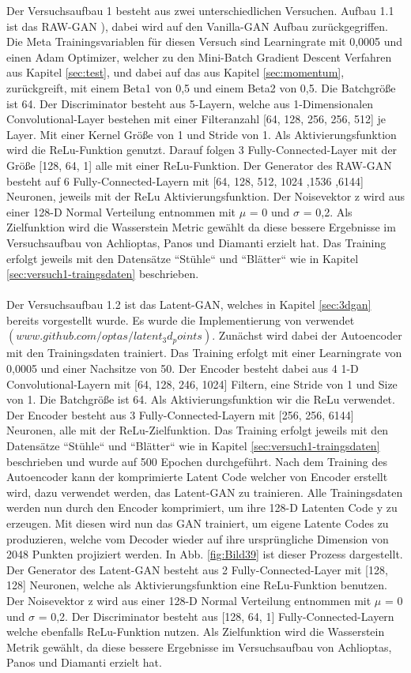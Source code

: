 \documentclass{llncs}
\begin{document}
Der Versuchsaufbau 1 besteht aus zwei unterschiedlichen Versuchen. Aufbau 1.1 ist das RAW-GAN \cite{3dgan}), dabei wird auf den Vanilla-GAN Aufbau zurückgegriffen. Die Meta Trainingsvariablen für diesen Versuch sind Learningrate mit 0,0005 und einen Adam Optimizer, welcher zu den Mini-Batch Gradient Descent Verfahren aus Kapitel \ref{sec:test}, und dabei auf das aus Kapitel \ref{sec:momentum}, zurückgreift, mit einem Beta1 von 0,5 und einem Beta2 von 0,5. Die Batchgröße ist 64. Der Discriminator besteht aus 5-Layern, welche aus 1-Dimensionalen Convolutional-Layer bestehen mit einer Filteranzahl [64, 128, 256, 256, 512] je Layer. Mit einer Kernel Größe von 1 und Stride von 1. Als Aktivierungsfunktion wird die ReLu-Funktion genutzt. Darauf folgen 3 Fully-Connected-Layer mit der Größe [128, 64, 1] alle mit einer ReLu-Funktion. Der Generator des RAW-GAN besteht auf 6 Fully-Connected-Layern mit [64, 128, 512, 1024 ,1536 ,6144] Neuronen, jeweils mit der ReLu Aktivierungsfunktion. Der Noisevektor z wird aus einer 128-D Normal Verteilung entnommen mit $\mu$ = 0 und $\sigma$ =  0,2. Als Zielfunktion wird die Wasserstein Metric gewählt da diese bessere Ergebnisse im Versuchsaufbau von Achlioptas, Panos und Diamanti \cite{3dgan} erzielt hat. Das Training erfolgt jeweils mit den Datensätze ``Stühle`` und ``Blätter`` wie in Kapitel \ref{sec:versuch1-traingsdaten} beschrieben.
\\\\
Der Versuchsaufbau 1.2 ist das Latent-GAN, welches in Kapitel \ref{sec:3dgan} bereits vorgestellt wurde. Es wurde die Implementierung von \cite{3dgan} verwendet $(www.github.com/optas/latent_3d_points)$. Zunächst wird dabei der Autoencoder mit den Trainingsdaten trainiert. Das Training erfolgt mit einer Learningrate von 0,0005 und einer Nachsitze von 50. Der Encoder besteht dabei aus 4 1-D Convolutional-Layern mit [64, 128, 246, 1024] Filtern, eine Stride von 1 und Size von 1. Die Batchgröße ist 64. Als Aktivierungsfunktion wir die ReLu verwendet. Der Encoder besteht aus 3 Fully-Connected-Layern mit [256, 256, 6144] Neuronen, alle mit der ReLu-Zielfunktion. Das Training erfolgt jeweils mit den Datensätze ``Stühle`` und ``Blätter`` wie in Kapitel \ref{sec:versuch1-traingsdaten} beschrieben und wurde auf 500 Epochen durchgeführt. Nach dem Training des Autoencoder kann der komprimierte Latent Code welcher von Encoder erstellt wird, dazu verwendet werden, das Latent-GAN zu trainieren. Alle Trainingsdaten werden nun durch den Encoder komprimiert, um ihre 128-D Latenten Code y zu erzeugen. Mit diesen wird nun das GAN trainiert, um eigene Latente Codes zu produzieren, welche vom Decoder wieder auf ihre ursprüngliche Dimension von 2048 Punkten projiziert werden. In Abb. \ref{fig:Bild39} ist dieser Prozess dargestellt. Der Generator des Latent-GAN besteht aus 2 Fully-Connected-Layer mit [128, 128] Neuronen, welche als Aktivierungsfunktion eine ReLu-Funktion benutzen. Der Noisevektor z wird aus einer 128-D Normal Verteilung entnommen mit $\mu$ = 0 und $\sigma$ =  0,2. Der Discriminator besteht aus [128, 64, 1] Fully-Connected-Layern welche ebenfalls ReLu-Funktion nutzen. Als Zielfunktion wird die Wasserstein Metrik gewählt, da diese bessere Ergebnisse im Versuchsaufbau von Achlioptas, Panos und Diamanti\cite{3dgan} erzielt hat. 
\end{document}
